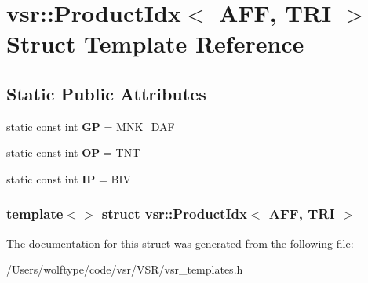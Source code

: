 \hypertarget{structvsr_1_1_product_idx_3_01_a_f_f_00_01_t_r_i_01_4}{\section{vsr\-:\-:Product\-Idx$<$ A\-F\-F, T\-R\-I $>$ Struct Template Reference}
\label{structvsr_1_1_product_idx_3_01_a_f_f_00_01_t_r_i_01_4}
}
\subsection*{Static Public Attributes}
\begin{DoxyCompactItemize}
\item 
\hypertarget{structvsr_1_1_product_idx_3_01_a_f_f_00_01_t_r_i_01_4_a7289b7823e8b78391898c225c71762fa}{static const int {\bfseries G\-P} = M\-N\-K\-\_\-\-D\-A\-F}\label{structvsr_1_1_product_idx_3_01_a_f_f_00_01_t_r_i_01_4_a7289b7823e8b78391898c225c71762fa}

\item 
\hypertarget{structvsr_1_1_product_idx_3_01_a_f_f_00_01_t_r_i_01_4_aafccfd3ff3dc572190b5213f341075c8}{static const int {\bfseries O\-P} = T\-N\-T}\label{structvsr_1_1_product_idx_3_01_a_f_f_00_01_t_r_i_01_4_aafccfd3ff3dc572190b5213f341075c8}

\item 
\hypertarget{structvsr_1_1_product_idx_3_01_a_f_f_00_01_t_r_i_01_4_a5c0cfc4f9c7259a3b39ca28838c2f685}{static const int {\bfseries I\-P} = B\-I\-V}\label{structvsr_1_1_product_idx_3_01_a_f_f_00_01_t_r_i_01_4_a5c0cfc4f9c7259a3b39ca28838c2f685}

\end{DoxyCompactItemize}
\subsubsection*{template$<$$>$ struct vsr\-::\-Product\-Idx$<$ A\-F\-F, T\-R\-I $>$}



The documentation for this struct was generated from the following file\-:\begin{DoxyCompactItemize}
\item 
/\-Users/wolftype/code/vsr/\-V\-S\-R/vsr\-\_\-templates.\-h\end{DoxyCompactItemize}
